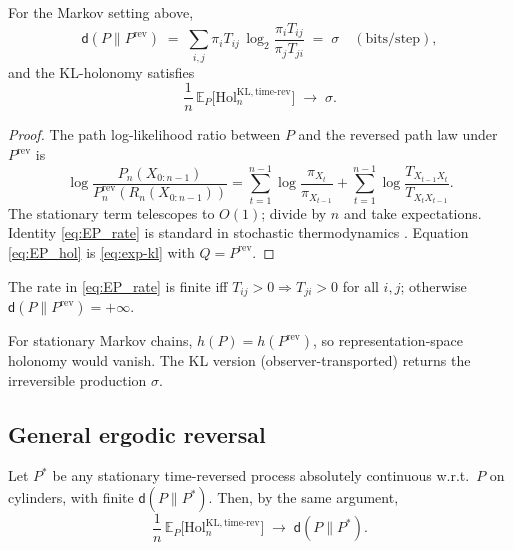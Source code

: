 \documentclass[11pt]{article}
\newcommand{\E}{\mathbb{E}}
\newcommand{\1}{\mathbbm{1}}
\begin{document}
\begin{theorem}\label{thm:EP}
For the Markov setting above,
\begin{equation}\label{eq:EP_rate}
\mathsf{d}(P\|P^{\mathrm{rev}}) \;=\; \sum_{i,j}\pi_i T_{ij}\,\log_2\frac{\pi_i T_{ij}}{\pi_j T_{ji}} \;=\; \sigma\quad(\text{bits/step}),
\end{equation}
and the KL-holonomy satisfies
\begin{equation}\label{eq:EP_hol}
\frac{1}{n}\,\E_P\big[\mathrm{Hol}_{n}^{\mathrm{KL},\mathrm{time\text{-}rev}}\big] \;\to\; \sigma.
\end{equation}
\end{theorem}
\begin{proof}
The path log-likelihood ratio between $P$ and the reversed path law under $P^{\mathrm{rev}}$ is
\[
\log\frac{P_n(X_{0:n-1})}{P_n^{\mathrm{rev}}(R_n(X_{0:n-1}))}
= \sum_{t=1}^{n-1}\log\frac{\pi_{X_t}}{\pi_{X_{t-1}}}
+ \sum_{t=1}^{n-1}\log\frac{T_{X_{t-1}X_t}}{T_{X_t X_{t-1}}}.
\]
The stationary term telescopes to $O(1)$; divide by $n$ and take expectations. Identity \eqref{eq:EP_rate} is standard in stochastic thermodynamics \cite{schnakenberg1976,seifert2012}. Equation \eqref{eq:EP_hol} is \eqref{eq:exp-kl} with $Q=P^{\mathrm{rev}}$.
\end{proof}

\begin{remark}
The rate in \eqref{eq:EP_rate} is finite iff $T_{ij}>0 \Rightarrow T_{ji}>0$
for all $i,j$; otherwise $\mathsf{d}(P\|P^{\mathrm{rev}})=+\infty$.
\end{remark}

\begin{remark}
For stationary Markov chains, $h(P)=h(P^{\mathrm{rev}})$, so representation-space holonomy would vanish. The KL version (observer-transported) returns the irreversible production $\sigma$.
\end{remark}

\subsection{General ergodic reversal}
Let $P^\ast$ be any stationary time-reversed process absolutely continuous w.r.t.\ $P$ on cylinders, with finite $\mathsf{d}(P\|P^\ast)$. Then, by the same argument,
\begin{equation}\label{eq:general_rev}
\frac{1}{n}\,\E_P\big[\mathrm{Hol}_{n}^{\mathrm{KL},\mathrm{time\text{-}rev}}\big] \;\to\; \mathsf{d}(P\|P^\ast).
\end{equation}
\end{document}
